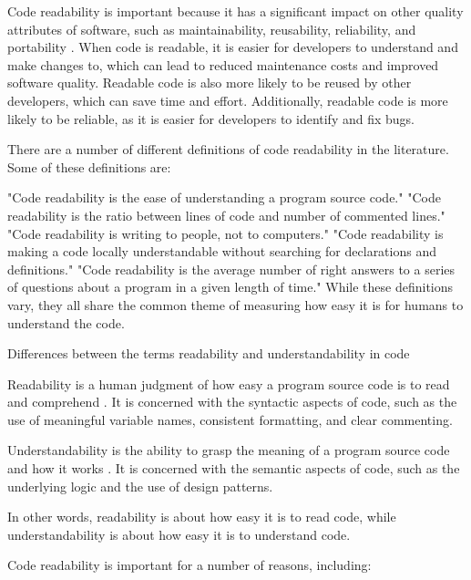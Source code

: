 \documentclass[%
class=scrreprt,
chapterprefix=false,%
open=right,%
twoside=false,%
paper=a4,%
logofile={Logo\_zentral\_farbig\_EN.png},%
thesistype=master,%
UKenglish,%
]{se2thesis}
\begin{document}
	Code readability is important because it has a significant impact on other quality attributes of software, such as maintainability, reusability, reliability, and portability \cite{tashtoush2013impact}. When code is readable, it is easier for developers to understand and make changes to, which can lead to reduced maintenance costs and improved software quality. Readable code is also more likely to be reused by other developers, which can save time and effort. Additionally, readable code is more likely to be reliable, as it is easier for developers to identify and fix bugs.
	
	There are a number of different definitions of code readability in the literature. Some of these definitions are:
	
	"Code readability is the ease of understanding a program source code." \cite{buse2008evaluating}
	"Code readability is the ratio between lines of code and number of commented lines." \cite{sedano2016code}
	"Code readability is writing to people, not to computers." \cite{oliveira2020evaluating}
	"Code readability is making a code locally understandable without searching for declarations and definitions." \cite{oliveira2020evaluating}
	"Code readability is the average number of right answers to a series of questions about a program in a given length of time." \cite{oliveira2020evaluating}
	While these definitions vary, they all share the common theme of measuring how easy it is for humans to understand the code.
	
	Differences between the terms readability and understandability in code
	
	Readability is a human judgment of how easy a program source code is to read and comprehend \cite{buse2008evaluating, sedano2016code}. It is concerned with the syntactic aspects of code, such as the use of meaningful variable names, consistent formatting, and clear commenting.
	
	Understandability is the ability to grasp the meaning of a program source code and how it works \cite{oliveira2020evaluating, posnett2011simpler}. It is concerned with the semantic aspects of code, such as the underlying logic and the use of design patterns.
	
	In other words, readability is about how easy it is to read code, while understandability is about how easy it is to understand code.
	
	Code readability is important for a number of reasons, including:
	
\end{document}
